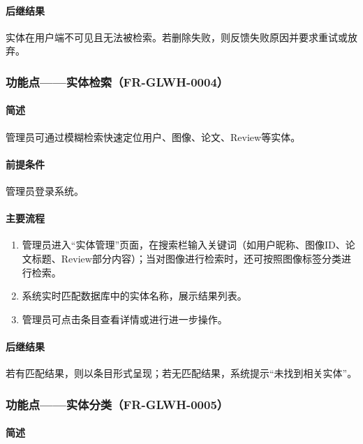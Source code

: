{\paragraph*{后继结果}

实体在用户端不可见且无法被检索。若删除失败，则反馈失败原因并要求重试或放弃。

\subsubsection{功能点——实体检索（FR-GLWH-0004）}

\paragraph*{简述}

管理员可通过模糊检索快速定位用户、图像、论文、Review等实体。

\paragraph*{前提条件}

管理员登录系统。

\paragraph*{主要流程}

\begin{enumerate}
    \item 管理员进入“实体管理”页面，在搜索栏输入关键词（如用户昵称、图像ID、论文标题、Review部分内容）；当对图像进行检索时，还可按照图像标签分类进行检索。
    \item 系统实时匹配数据库中的实体名称，展示结果列表。
    \item 管理员可点击条目查看详情或进行进一步操作。
\end{enumerate}

\paragraph*{后继结果}

若有匹配结果，则以条目形式呈现；若无匹配结果，系统提示“未找到相关实体”。

\subsubsection{功能点——实体分类（FR-GLWH-0005）}

\paragraph*{简述}

}
